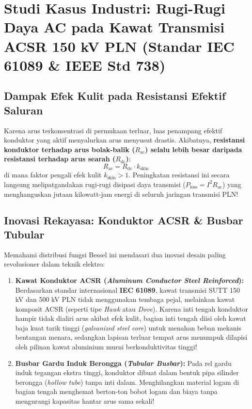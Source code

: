\documentclass[11pt,a4paper]{article}
\theoremstyle{definition}
\begin{document}
\section{Studi Kasus Industri: Rugi-Rugi Daya AC pada Kawat Transmisi ACSR 150 kV PLN (Standar IEC 61089 \& IEEE Std 738)}

\subsection{Dampak Efek Kulit pada Resistansi Efektif Saluran}
Karena arus terkonsentrasi di permukaan terluar, luas penampang efektif konduktor yang aktif menyalurkan arus menyusut drastis. Akibatnya, \textbf{resistansi konduktor terhadap arus bolak-balik ($R_{\text{ac}}$) selalu lebih besar daripada resistansi terhadap arus searah ($R_{\text{dc}}$)}:
\begin{equation}
    R_{\text{ac}} = R_{\text{dc}} \cdot k_{\text{skin}}
\end{equation}
di mana faktor pengali efek kulit $k_{\text{skin}} > 1$. Peningkatan resistansi ini secara langsung melipatgandakan rugi-rugi disipasi daya transmisi ($P_{\text{loss}} = I^2 R_{\text{ac}}$) yang menghanguskan jutaan kilowatt-jam energi di seluruh jaringan transmisi PLN!

\subsection{Inovasi Rekayasa: Konduktor ACSR \& Busbar Tubular}
Memahami distribusi fungsi Bessel ini mendasari dua inovasi desain paling revolusioner dalam teknik elektro:
\begin{enumerate}[leftmargin=*]
    \item \textbf{Kawat Konduktor ACSR (\textit{Aluminum Conductor Steel Reinforced}):}
    Berdasarkan standar internasional \textbf{IEC 61089}, kawat transmisi SUTT 150 kV dan 500 kV PLN tidak menggunakan tembaga pejal, melainkan kawat komposit ACSR (seperti tipe \textit{Hawk} atau \textit{Dove}). Karena inti tengah konduktor hampir tidak dialiri arus akibat efek kulit, bagian inti tengah diisi oleh kawat baja kuat tarik tinggi (\textit{galvanized steel core}) untuk menahan beban mekanis bentangan menara, sedangkan lapisan terluar tempat arus menumpuk dilapisi oleh pilinan kawat aluminium murni berkonduktivitas tinggi!
    \item \textbf{Busbar Gardu Induk Berongga (\textit{Tubular Busbar}):}
    Pada rel gardu induk tegangan ekstra tinggi, konduktor dibuat dalam bentuk pipa silinder berongga (\textit{hollow tube}) tanpa inti dalam. Menghilangkan material logam di bagian tengah menghemat berton-ton bobot logam dan biaya tanpa mengurangi kapasitas hantar arus sama sekali!
\end{enumerate}
\end{document}

